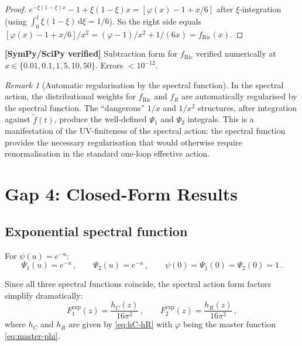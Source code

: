\documentclass[11pt,a4paper]{article}
\renewcommand{\dd}{\mathrm{d}}
\theoremstyle{definition}
\theoremstyle{remark}
\newtheorem{remark}[theorem]{Remark}
\newcommand{\verified}[1]{%
  \par\noindent\colorbox{green!10}{%
    \parbox{\dimexpr\linewidth-2\fboxsep}{%
      \textcolor{green!50!black}{\textbf{[SymPy/SciPy verified]}}
      \textcolor{green!50!black}{#1}%
    }%
  }\par%
}
\begin{document}
\begin{proof}
$e^{-\xi(1-\xi)x} - 1 + \xi(1-\xi)x =
[\varphi(x) - 1 + x/6]$ after $\xi$-integration
(using $\int_0^1\xi(1-\xi)\,\dd\xi = 1/6$).
So the right side equals $[\varphi(x) - 1 + x/6]/x^2 =
(\varphi-1)/x^2 + 1/(6x) = f_{\text{Ric}}(x)$.
\end{proof}

\verified{Subtraction form for $f_{\mathrm{Ric}}$ verified numerically
at $x \in \{0.01, 0.1, 1, 5, 10, 50\}$.  Errors $< 10^{-12}$.}

\begin{remark}[Automatic regularisation by the spectral function]
In the spectral action, the distributional weights for $f_{\text{Ric}}$
and $f_R$ are automatically regularised by the spectral function.
The ``dangerous'' $1/x$ and $1/x^2$ structures, after integration
against $\tilde{f}(t)$, produce the well-defined
$\Psi_1$ and $\Psi_2$ integrals.  This is a manifestation of the
UV-finiteness of the spectral action: the spectral function provides
the necessary regularisation that would otherwise require
renormalisation in the standard one-loop effective action.
\end{remark}


\newpage
\section{Gap 4: Closed-Form Results}
\label{sec:gap4}

\subsection{Exponential spectral function}

For $\psi(u) = e^{-u}$:
\begin{equation}
  \Psi_1(u) = e^{-u}\,,\qquad
  \Psi_2(u) = e^{-u}\,,\qquad
  \psi(0) = \Psi_1(0) = \Psi_2(0) = 1\,.
  \label{eq:exp-specfuncs}
\end{equation}

Since all three spectral functions coincide, the spectral action
form factors simplify dramatically:
\begin{equation}
  \boxed{
  F_1^{\exp}(z) = \frac{h_C(z)}{16\pi^2}\,,\qquad
  F_2^{\exp}(z) = \frac{h_R(z)}{16\pi^2}\,,
  }
  \label{eq:F-exponential}
\end{equation}
where $h_C$ and $h_R$ are given by \eqref{eq:hC-hR} with $\varphi$
being the master function \eqref{eq:master-phi}.
\end{document}
